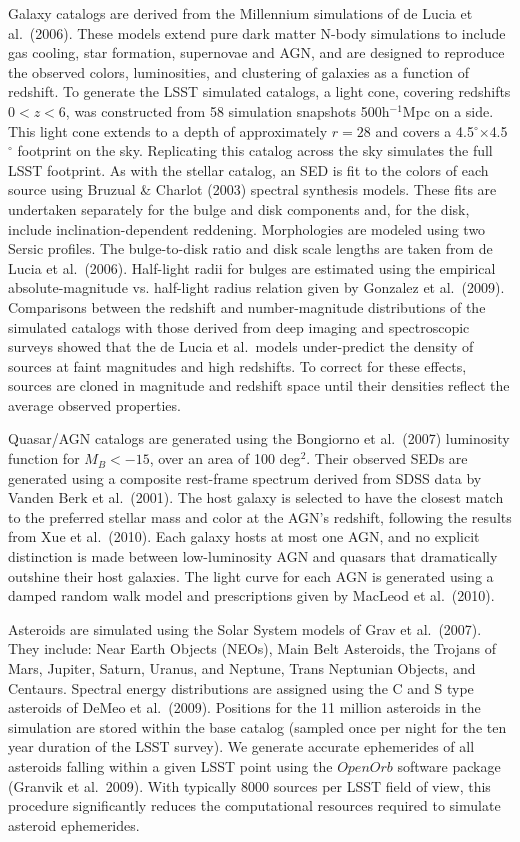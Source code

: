 {Galaxy catalogs are derived from the Millennium simulations of de
Lucia et al.~(2006).  These models extend pure dark matter N-body
simulations to include gas cooling, star formation, supernovae and
AGN, and are designed to reproduce the observed colors, luminosities,
and clustering of galaxies as a function of redshift. To generate the
LSST simulated catalogs, a light cone, covering redshifts $0<z<6$, was
constructed from 58 simulation snapshots 500h$^{-1}$Mpc on a side. This
light cone extends to a depth of approximately $r=28$ and covers a
4.5$^\circ$$\times$4.5$^\circ$ footprint on the sky. Replicating this
catalog across the sky simulates the full LSST footprint. As with the
stellar catalog, an SED is fit to the colors of each source using
Bruzual \& Charlot (2003) spectral synthesis models. These fits are
undertaken separately for the bulge and disk components and, for the
disk, include inclination-dependent reddening. Morphologies are
modeled using two Sersic profiles. The bulge-to-disk ratio and disk
scale lengths are taken from de Lucia et al.~(2006). Half-light radii
for bulges are estimated using the empirical absolute-magnitude
vs. half-light radius relation given by Gonzalez et
al.~(2009). Comparisons between the redshift and number-magnitude
distributions of the simulated catalogs with those derived from deep
imaging and spectroscopic surveys showed that the de Lucia et
al.~models under-predict the density of sources at faint magnitudes
and high redshifts. To correct for these effects, sources are cloned
in magnitude and redshift space until their densities reflect the
average observed properties.

Quasar/AGN catalogs are generated using the Bongiorno et al.~(2007)
luminosity function for $M_B < -15$, over an area of 100
deg$^2$. Their observed SEDs are generated using a composite
rest-frame spectrum derived from SDSS data by Vanden Berk et
al.~(2001). The host galaxy is selected to have the closest match to
the preferred stellar mass and color at the AGN's redshift, following
the results from Xue et al.~(2010).  Each galaxy hosts at most one
AGN, and no explicit distinction is made between low-luminosity AGN and
quasars that dramatically outshine their host galaxies. The light
curve for each AGN is generated using a damped random walk model and
prescriptions given by MacLeod et al.~(2010).

Asteroids are simulated using the Solar System models of Grav et
al.~(2007). They include: Near Earth Objects (NEOs), Main Belt
Asteroids, the Trojans of Mars, Jupiter, Saturn, Uranus, and Neptune,
Trans Neptunian Objects, and Centaurs. Spectral energy distributions
are assigned using the C and S type asteroids of DeMeo et
al.~(2009). Positions for the 11 million asteroids in the simulation
are stored within the base catalog (sampled once per night for the ten
year duration of the LSST survey). We generate
accurate ephemerides of all asteroids falling within a given LSST
point using the $OpenOrb$ software package (Granvik et
al.~2009). With typically 8000 sources per LSST field of view, this
procedure significantly reduces the computational resources
required to simulate asteroid ephemerides.



}
